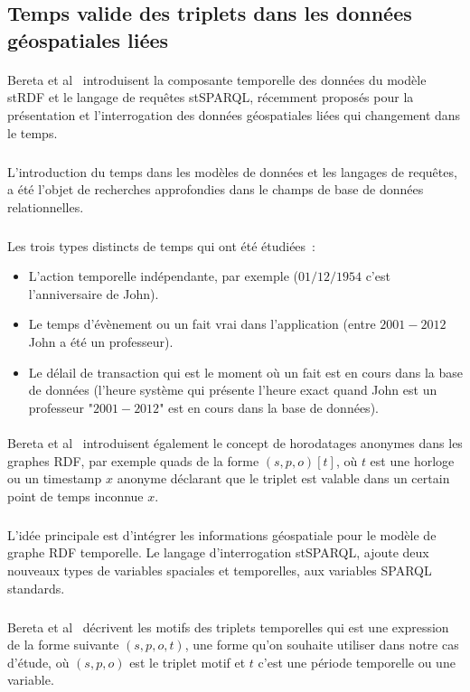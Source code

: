 \subsection*{Temps valide des triplets dans les données géospatiales liées}
\paragraph{}
Bereta et al~\cite{bereta2013} introduisent la composante temporelle des données du modèle stRDF et le langage de requêtes stSPARQL, récemment proposés pour la présentation et l’interrogation des données géospatiales liées qui changement dans le temps.
\subparagraph{}
L’introduction du temps dans les modèles de données et les langages de requêtes, a été l’objet de recherches approfondies dans le champs de base de données relationnelles.
\subparagraph{}
Les trois types distincts de temps qui ont été  étudiées~:
\begin{itemize}
\item L'action temporelle indépendante, par exemple ($01/12/1954$ c’est l’anniversaire de John).
\item Le temps d’évènement ou un fait vrai dans l’application (entre $2001-2012$ John a été un professeur).
\item Le délail de transaction qui est le moment où un fait est en cours dans la base de données (l’heure système qui présente l’heure exact quand John est un professeur "$2001-2012$" est en cours dans la base de données).
\end{itemize}
\paragraph{}
Bereta et al~\cite{bereta2013} introduisent également le concept de horodatages anonymes dans les graphes RDF, par exemple quads de la forme $(s, p, o)[t]$, où $t$ est une horloge ou un timestamp $x$ anonyme déclarant que le triplet est valable dans un certain point de temps inconnue $x$.
\subparagraph{}
L’idée principale est d’intégrer les informations géospatiale pour le modèle de graphe RDF temporelle. Le langage d’interrogation stSPARQL, ajoute deux nouveaux types de variables spaciales et temporelles, aux variables SPARQL standards.
\subparagraph{}
Bereta et al~\cite{bereta2013} décrivent les motifs des triplets temporelles qui est une expression de la forme suivante $(s, p, o, t)$, une forme qu'on souhaite utiliser dans notre cas d'étude, où $(s, p, o)$ est le triplet motif et $t$ c’est une période temporelle ou une variable.
